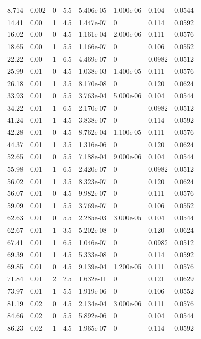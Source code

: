 \documentclass[preview]{standalone}
\begin{document}
{{\begin{tabular}{L{1.2cm}C{1.2cm} C{0.3cm}C{0.5cm} C{1.4cm}C{1.4cm} C{1.4cm}C{1.4cm}}
  8.714  &  0.002  & 0     & 5.5 &  5.406e-05  & 1.000e-06  & 0.104 &  0.0544   \\ 
  14.41  &  0.00  & 1     & 4.5 &  1.447e-07  & 0  & 0.114 &  0.0592   \\ 
  16.02  &  0.00  & 0     & 4.5 &  1.161e-04  & 2.000e-06  & 0.111 &  0.0576   \\ 
  18.65  &  0.00  & 1     & 5.5 &  1.166e-07  & 0  & 0.106 &  0.0552   \\ 
  22.22  &  0.00  & 1     & 6.5 &  4.469e-07  & 0  & 0.0982 &  0.0512   \\ 
  25.99  &  0.01  & 0     & 4.5 &  1.038e-03  & 1.400e-05  & 0.111 &  0.0576   \\ 
  26.18  &  0.01  & 1     & 3.5 &  8.170e-08  & 0  & 0.120 &  0.0624   \\ 
  33.93  &  0.01  & 0     & 5.5 &  3.763e-04  & 5.000e-06  & 0.104 &  0.0544   \\ 
  34.22  &  0.01  & 1     & 6.5 &  2.170e-07  & 0  & 0.0982 &  0.0512   \\ 
  41.24  &  0.01  & 1     & 4.5 &  3.838e-07  & 0  & 0.114 &  0.0592   \\ 
  42.28  &  0.01  & 0     & 4.5 &  8.762e-04  & 1.100e-05  & 0.111 &  0.0576   \\ 
  44.37  &  0.01  & 1     & 3.5 &  1.316e-06  & 0  & 0.120 &  0.0624   \\ 
  52.65  &  0.01  & 0     & 5.5 &  7.188e-04  & 9.000e-06  & 0.104 &  0.0544   \\ 
  55.98  &  0.01  & 1     & 6.5 &  2.420e-07  & 0  & 0.0982 &  0.0512   \\ 
  56.02  &  0.01  & 1     & 3.5 &  8.323e-07  & 0  & 0.120 &  0.0624   \\ 
  56.07  &  0.01  & 0     & 4.5 &  9.982e-07  & 0  & 0.111 &  0.0576   \\ 
  59.09  &  0.01  & 1     & 5.5 &  3.769e-07  & 0  & 0.106 &  0.0552   \\ 
  62.63  &  0.01  & 0     & 5.5 &  2.285e-03  & 3.000e-05  & 0.104 &  0.0544   \\ 
  62.67  &  0.01  & 1     & 3.5 &  5.202e-08  & 0  & 0.120 &  0.0624   \\ 
  67.41  &  0.01  & 1     & 6.5 &  1.046e-07  & 0  & 0.0982 &  0.0512   \\ 
  69.39  &  0.01  & 1     & 4.5 &  5.333e-08  & 0  & 0.114 &  0.0592   \\ 
  69.85  &  0.01  & 0     & 4.5 &  9.139e-04  & 1.200e-05  & 0.111 &  0.0576   \\ 
  71.84  &  0.01  & 2     & 2.5 &  1.632e-11  & 0  & 0.121 &  0.0629   \\ 
  73.97  &  0.01  & 1     & 5.5 &  1.919e-06  & 0  & 0.106 &  0.0552   \\ 
  81.19  &  0.02  & 0     & 4.5 &  2.134e-04  & 3.000e-06  & 0.111 &  0.0576   \\ 
  84.66  &  0.02  & 0     & 5.5 &  5.892e-06  & 0  & 0.104 &  0.0544   \\ 
  86.23  &  0.02  & 1     & 4.5 &  1.965e-07  & 0  & 0.114 &  0.0592   \\ 
\hline 
\end{tabular} 

}}
\end{document}
